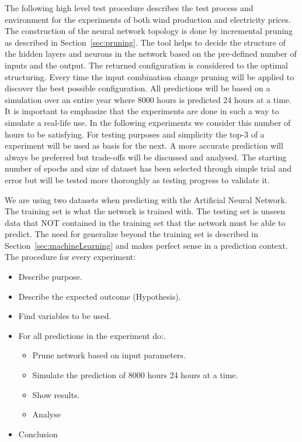 The following high level test procedure describes the test process and environment for the experiments of both wind production and electricity prices. 
\\[0.5cm]
The construction of the neural network topology is done by incremental pruning as described in Section~\ref{sec:pruning}. The tool helps to decide the structure of the hidden layers and neurons in the network based on the pre-defined number of inputs and the output. The returned configuration is considered to the optimal structuring. Every time the input combination change pruning will be applied to discover the best possible configuration. All predictions will be based on a simulation over an entire year where 8000 hours is predicted 24 hours at a time. It is important to emphasize that the experiments are done in such a way to simulate a real-life use. In the following experiments we consider this number of hours to be satisfying.  For testing purposes and simplicity the top-3 of a experiment will be used as basis for the next. A more accurate prediction will always be preferred but trade-offs will be discussed and analysed. The starting number of epochs and size of dataset has been selected through simple trial and error but will be tested more thoroughly as testing progress to validate it.

We are using two datasets when predicting with the Artificial Neural Network. The training set is what the network is trained with. The testing set is unseen data that NOT contained in the training set that the network must be able to predict. The need for generalize beyond the training set is described in Section~\ref{sec:machineLearning} and makes perfect sense in a prediction context.
\\[0.5cm]
The procedure for every experiment:
\begin{itemize}
\item Describe purpose.
\item Describe the expected outcome (Hypothesis).
\item Find variables to be used.
\item For all predictions in the experiment do:.
\begin{itemize}
	\item Prune network based on input parameters.
	\item Simulate the prediction of 8000 hours 24 hours at a time.
	\item Show results.
	\item Analyse
\end{itemize}
\item Conclusion

\end{itemize}